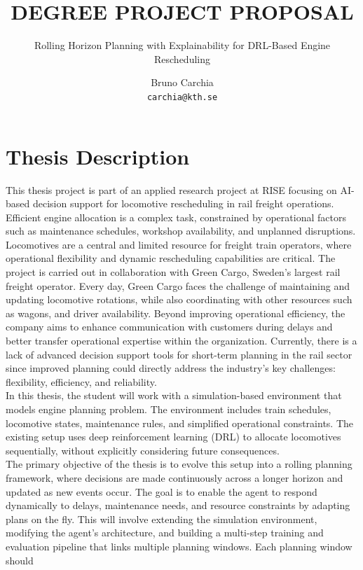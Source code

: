 \documentclass[a4paper]{scrartcl}
\title{DEGREE PROJECT PROPOSAL}
\subtitle{Rolling Horizon Planning with Explainability for DRL-Based Engine Rescheduling}
\author{
Bruno Carchia \\
\texttt{carchia@kth.se}
}
\begin{document}
\maketitle

\section{Thesis Description}
This thesis project is part of an applied research project at RISE focusing on AI-based
decision support for locomotive rescheduling in rail freight operations. Efficient engine
allocation is a complex task, constrained by operational factors such as maintenance
schedules, workshop availability, and unplanned disruptions.\\
Locomotives are a central and limited resource for freight train operators, where operational
flexibility and dynamic rescheduling capabilities are critical. The project is carried out in
collaboration with Green Cargo, Sweden’s largest rail freight operator. Every day, Green
Cargo faces the challenge of maintaining and updating locomotive rotations, while also
coordinating with other resources such as wagons, and driver availability. Beyond improving
operational efficiency, the company aims to enhance communication with customers during
delays and better transfer operational expertise within the organization. Currently, there is a
lack of advanced decision support tools for short-term planning in the rail sector since
improved planning could directly address the industry’s key challenges: flexibility, efficiency,
and reliability.\\
In this thesis, the student will work with a simulation-based environment that models engine
planning problem. The environment includes train schedules, locomotive states, maintenance
rules, and simplified operational constraints. The existing setup uses deep reinforcement
learning (DRL) to allocate locomotives sequentially, without explicitly considering future
consequences.\\
The primary objective of the thesis is to evolve this setup into a rolling planning framework,
where decisions are made continuously across a longer horizon and updated as new events
occur. The goal is to enable the agent to respond dynamically to delays, maintenance needs,
and resource constraints by adapting plans on the fly. This will involve extending the
simulation environment, modifying the agent’s architecture, and building a multi-step training
and evaluation pipeline that links multiple planning windows. Each planning window should
\end{document}

